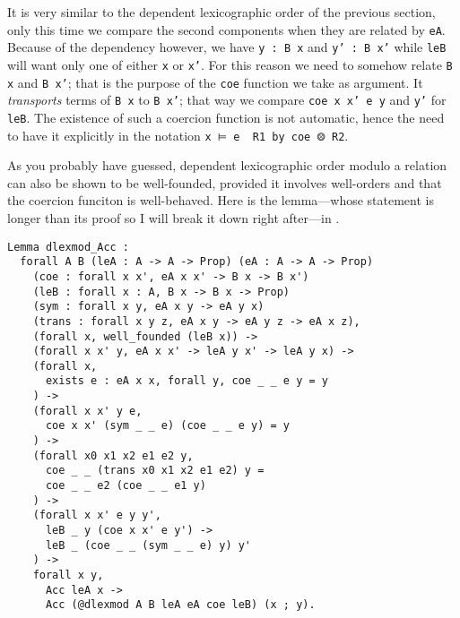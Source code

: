 It is very similar to the dependent lexicographic order of the previous section,
only this time we compare the second components when they are related by
\texttt{eA}. Because of the dependency however, we have
\texttt{y : B x} and \texttt{y' : B x'} while
\texttt{leB} will want only one of either \texttt{x} or
\texttt{x'}.
For this reason we need to somehow relate \texttt{B x} and
\texttt{B x'}; that is the purpose of the \texttt{coe}
function we take as argument. It \emph{transports} terms of
\texttt{B x} to \texttt{B x'}; that way we compare
\texttt{coe x x' e y} and \texttt{y'} for
\texttt{leB}.
The existence of such a coercion function is not automatic, hence the need to
have it explicitly in the notation \texttt{x ⊨ e \ R1 by coe ⨷ R2}.

As you probably have guessed, dependent lexicographic order modulo a relation
can also be shown to be well-founded, provided it involves well-orders and that
the coercion funciton is well-behaved.
Here is the lemma---whose statement is longer than its proof so I will break it
down right after---in \Coq.
\begin{verbatim}
Lemma dlexmod_Acc :
  forall A B (leA : A -> A -> Prop) (eA : A -> A -> Prop)
    (coe : forall x x', eA x x' -> B x -> B x')
    (leB : forall x : A, B x -> B x -> Prop)
    (sym : forall x y, eA x y -> eA y x)
    (trans : forall x y z, eA x y -> eA y z -> eA x z),
    (forall x, well_founded (leB x)) ->
    (forall x x' y, eA x x' -> leA y x' -> leA y x) ->
    (forall x,
      exists e : eA x x, forall y, coe _ _ e y = y
    ) ->
    (forall x x' y e,
      coe x x' (sym _ _ e) (coe _ _ e y) = y
    ) ->
    (forall x0 x1 x2 e1 e2 y,
      coe _ _ (trans x0 x1 x2 e1 e2) y =
      coe _ _ e2 (coe _ _ e1 y)
    ) ->
    (forall x x' e y y',
      leB _ y (coe x x' e y') ->
      leB _ (coe _ _ (sym _ _ e) y) y'
    ) ->
    forall x y,
      Acc leA x ->
      Acc (@dlexmod A B leA eA coe leB) (x ; y).
\end{verbatim}

